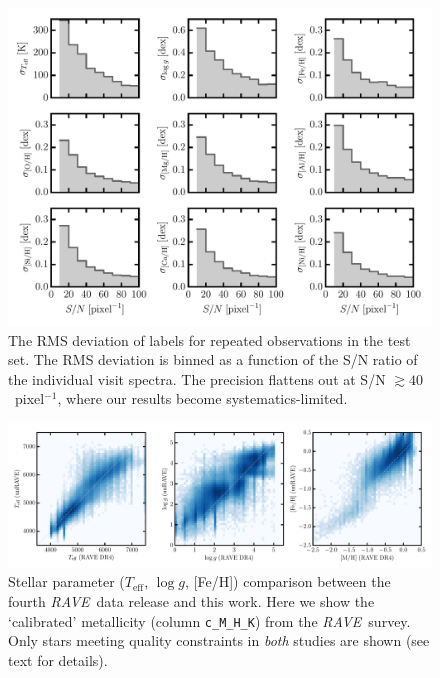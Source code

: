 \documentclass[preprint,trackchanges]{aastex}
\newcommand{\acronym}[1]{{\small{#1}}}
\newcommand{\project}[1]{\textsl{#1}}
\newcommand{\rave}{\project{\acronym{RAVE}}}
\newcommand{\teff}{T_{\mathrm{eff}}}
\newcommand{\logg}{\log g}
\begin{document}
\begin{figure}[p]
\includegraphics[width=\textwidth]{figures/repeat-visits.pdf}
\caption{The RMS deviation of labels for repeated observations in the test set.  The RMS deviation is binned as a function of the S/N ratio of the individual visit spectra.  The
precision flattens out at S/N $\gtrsim 40$~pixel$^{-1}$, where our results become systematics-limited.
\label{fig:repeat-visits}}
\end{figure}


\begin{figure}[p]
\includegraphics[width=\textwidth]{figures/dr4-comparison.pdf}
\caption{Stellar parameter ($\teff$, $\logg$, [Fe/H]) comparison between the fourth \rave\ data release \citep{Kordopatis_2013} and this work. Here we show the `calibrated' metallicity (column \texttt{c\_M\_H\_K}) from the \rave\ survey. Only stars meeting quality constraints in \emph{both} studies are shown (see text for details).\label{fig:rave-dr4-comparison}}
\end{figure}
\end{document}
